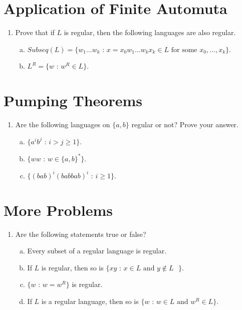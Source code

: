\documentclass[a4paper]{article}
\theoremstyle{definition}
\numberwithin{equation}{subsection}
\begin{document}
\section{Application of Finite Automuta}
\begin{enumerate}[1.]
\item Prove that if $L$ is regular, then the following languages are also regular.
    \begin{enumerate}[(a)]
        \item $Subseq(L) = \{\textrm{$w_1\ldots w_k$ : $x = x_0w_1\ldots w_kx_k \in L$ for some $x_0,\ldots,x_k$}\}$.
        \item $L^R = \{\textrm{$w$ : $w^R\in L$}\}$.
    \end{enumerate}
\end{enumerate}
\section{Pumping Theorems}
\begin{enumerate}[1.]
\item Are the following languages on $\{a,b\}$ regular or not? Prove your answer.
    \begin{enumerate}[(a)]
        \item $\{\textrm{$a^ib^j$ : $i > j\geq 1$}\}$.
        \item $\{\textrm{$ww$ : $w\in \{a,b\}^*$}\}$.
        \item $\{\textrm{$(bab)^i(babbab)^i$ : $i\geq 1$}\}$.
    \end{enumerate}
\end{enumerate}
\section{More Problems}
\begin{enumerate}[1.]
\item Are the following statements true or false?
\begin{enumerate}[(a)]
\item Every subset of a regular language is regular.
\item If $L$ is regular, then so is $\{\textrm{$xy$ : $x\in L$ and $y\notin L$ }\}$.
\item $\{\textrm{$w$ : $w = w^R$}\}$ is regular.
\item If $L$ is a regular language, then so is $\{\textrm{$w$ : $w\in L$ and $w^R\in L$}\}$.
\end{enumerate}
\end{enumerate}
\end{document}
